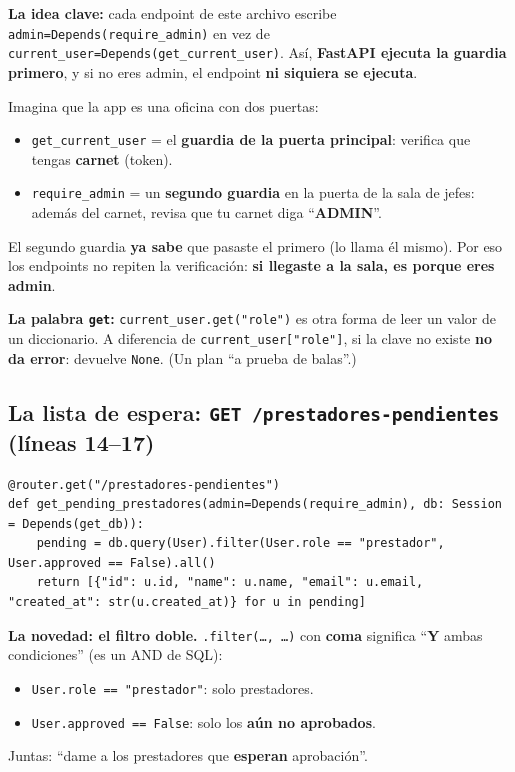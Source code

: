 \documentclass[11pt,a4paper]{article}
\begin{document}
\textbf{La idea clave:} cada endpoint de este archivo escribe
\texttt{admin=Depends(require\_admin)} en vez de
\texttt{current\_user=Depends(get\_current\_user)}. Así, \textbf{FastAPI ejecuta la guardia
primero}, y si no eres admin, el endpoint \textbf{ni siquiera se ejecuta}.

\begin{analogia}
Imagina que la app es una oficina con dos puertas:
\begin{itemize}
    \item \texttt{get\_current\_user} = el \textbf{guardia de la puerta principal}: verifica
    que tengas \textbf{carnet} (token).
    \item \texttt{require\_admin} = un \textbf{segundo guardia} en la puerta de la sala de
    jefes: además del carnet, revisa que tu carnet diga ``\textbf{ADMIN}''.
\end{itemize}
El segundo guardia \textbf{ya sabe} que pasaste el primero (lo llama él mismo). Por eso los
endpoints no repiten la verificación: \textbf{si llegaste a la sala, es porque eres admin}.
\end{analogia}

\textbf{La palabra \texttt{get}:} \texttt{current\_user.get("role")} es otra forma de leer un
valor de un diccionario. A diferencia de \texttt{current\_user["role"]}, si la clave no existe
\textbf{no da error}: devuelve \texttt{None}. (Un plan ``a prueba de balas''.)

\subsection{La lista de espera: \texttt{GET /prestadores-pendientes} (líneas 14--17)}

\begin{lstlisting}
@router.get("/prestadores-pendientes")
def get_pending_prestadores(admin=Depends(require_admin), db: Session = Depends(get_db)):
    pending = db.query(User).filter(User.role == "prestador", User.approved == False).all()
    return [{"id": u.id, "name": u.name, "email": u.email, "created_at": str(u.created_at)} for u in pending]
\end{lstlisting}

\textbf{La novedad: el filtro doble.} \texttt{.filter(\dots, \dots)} con \textbf{coma} significa
``\textbf{Y} ambas condiciones'' (es un AND de SQL):
\begin{itemize}
    \item \texttt{User.role == "prestador"}: solo prestadores.
    \item \texttt{User.approved == False}: solo los \textbf{aún no aprobados}.
\end{itemize}
Juntas: ``dame a los prestadores que \textbf{esperan} aprobación''.
\end{document}
